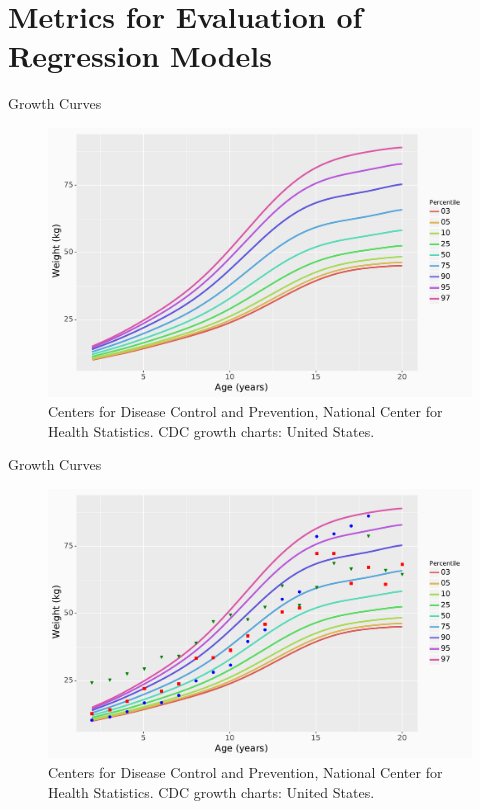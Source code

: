\documentclass[10pt, xcolor=table]{beamer}
\begin{document}
\section{Metrics for Evaluation of Regression Models}

\begin{frame}{Growth Curves}
	\begin{figure}
		\includegraphics[height=0.77\textheight]{images/growth_curves.pdf}
		\caption*{Centers for Disease Control and Prevention, National Center for Health Statistics. CDC growth charts: United States. }
	\end{figure}
	
\end{frame}

\begin{frame}{Growth Curves}
	\begin{figure}
		\includegraphics[height=0.77\textheight]{images/growth_curves_measured.pdf}
		\caption*{Centers for Disease Control and Prevention, National Center for Health Statistics. CDC growth charts: United States. }
	\end{figure}
\end{frame}
\end{document}
